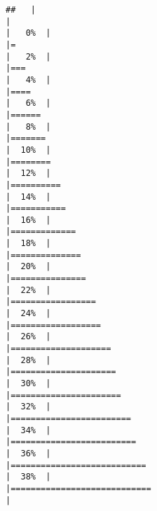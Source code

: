 \documentclass[
]{article}
\begin{document}
\begin{verbatim}
##   |                                                                              |                                                                      |   0%  |                                                                              |=                                                                     |   2%  |                                                                              |===                                                                   |   4%  |                                                                              |====                                                                  |   6%  |                                                                              |======                                                                |   8%  |                                                                              |=======                                                               |  10%  |                                                                              |========                                                              |  12%  |                                                                              |==========                                                            |  14%  |                                                                              |===========                                                           |  16%  |                                                                              |=============                                                         |  18%  |                                                                              |==============                                                        |  20%  |                                                                              |===============                                                       |  22%  |                                                                              |=================                                                     |  24%  |                                                                              |==================                                                    |  26%  |                                                                              |====================                                                  |  28%  |                                                                              |=====================                                                 |  30%  |                                                                              |======================                                                |  32%  |                                                                              |========================                                              |  34%  |                                                                              |=========================                                             |  36%  |                                                                              |===========================                                           |  38%  |                                                                              |============================                                          |  
\end{verbatim}
\end{document}
